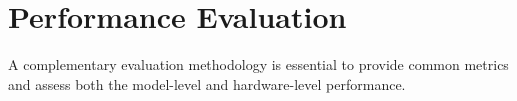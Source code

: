 \section{Performance Evaluation}
\label{sec:eval}
A complementary evaluation methodology is essential to provide common metrics and assess both the model-level and hardware-level performance.


